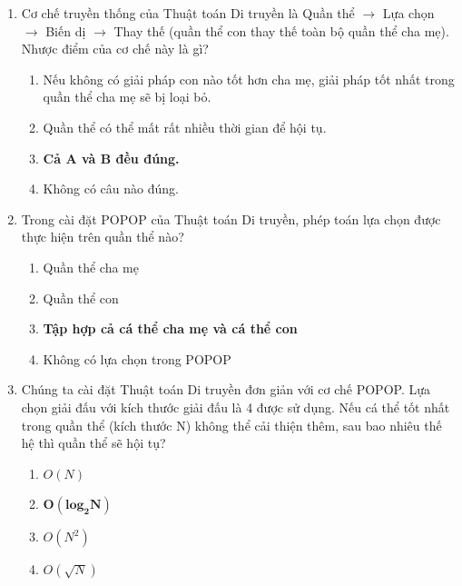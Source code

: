 \documentclass{book}
\begin{document}
\begin{enumerate}
    \item Cơ chế truyền thống của Thuật toán Di truyền là Quần thể $\rightarrow$ Lựa chọn $\rightarrow$ Biến dị $\rightarrow$ Thay thế (quần thể con thay thế toàn bộ quần thể cha mẹ). Nhược điểm của cơ chế này là gì?
    \begin{multicols}{2}
        \begin{enumerate}[label=\Alph*]
            \item Nếu không có giải pháp con nào tốt hơn cha mẹ, giải pháp tốt nhất trong quần thể cha mẹ sẽ bị loại bỏ.
            \item Quần thể có thể mất rất nhiều thời gian để hội tụ.
            \item \textbf{Cả A và B đều đúng.}
            \item Không có câu nào đúng.
        \end{enumerate}
    \end{multicols}

    \item Trong cài đặt POPOP của Thuật toán Di truyền, phép toán lựa chọn được thực hiện trên quần thể nào?
    \begin{multicols}{2}
        \begin{enumerate}[label=\Alph*]
            \item Quần thể cha mẹ
            \item Quần thể con
            \item \textbf{Tập hợp cả cá thể cha mẹ và cá thể con}
            \item Không có lựa chọn trong POPOP
        \end{enumerate}
    \end{multicols}

    \item Chúng ta cài đặt Thuật toán Di truyền đơn giản với cơ chế POPOP. Lựa chọn giải đấu với kích thước giải đấu là 4 được sử dụng. Nếu cá thể tốt nhất trong quần thể (kích thước N) không thể cải thiện thêm, sau bao nhiêu thế hệ thì quần thể sẽ hội tụ?
    \begin{multicols}{2}
        \begin{enumerate}[label=\Alph*]
            \item $O(N)$
            \item $\mathbf{O(log_{2}N)}$
            \item $O(N^2)$
            \item $O(\sqrt{N})$
        \end{enumerate}
    \end{multicols}

\end{enumerate}
\end{document}
